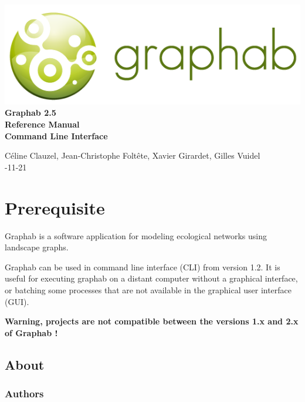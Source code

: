 \documentclass[a4paper,10pt]{report}
\begin{document}
\begin{titlepage}
	
	\centering
	\includegraphics[scale=0.5]{img/logo.png}\\
	
	\bigskip
	\bigskip
	\bigskip	
	{\Huge
		\bfseries
		Graphab 2.5\\
		\bigskip
		Reference Manual\\
		Command Line Interface\\
	}
	\bigskip
	\bigskip
	\bigskip
	\bigskip
	\bigskip
	
	{\Large		
		Céline Clauzel, Jean-Christophe Foltête, Xavier Girardet, Gilles Vuidel\\
		-11-21\\
	}
	
\end{titlepage}

\tableofcontents

\chapter{Prerequisite}
Graphab is a software application for modeling ecological networks using landscape graphs.

Graphab can be used in command line interface (CLI) from version 1.2.
It is useful for executing graphab on a distant computer without a graphical interface, or batching some processes that are not available in the graphical user interface (GUI).

\textbf{Warning, projects are not compatible between the versions 1.x and 2.x of Graphab !}

\section{About}

\subsection{Authors}
\end{document}
